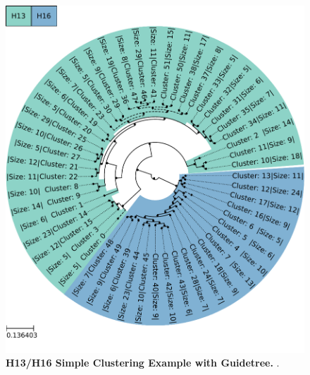 \begin{figure}[!hbt]
    \centering
    \includegraphics[width=\textwidth]{PCA/Clustertree_Segment_4_H_Focus.pdf}
    \caption[H13/H16 Simple Clustering Example with Guidetree]{\textbf{H13/H16 Simple Clustering Example with Guidetree.} .}
    \label{fig:Simple_Clustertree_MSA}
\end{figure}

